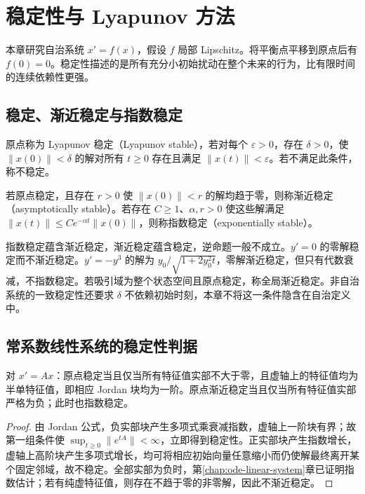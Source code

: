 \setcounter{chapter}{8} %
\chapter{稳定性与 Lyapunov 方法}
\label{chap:ode-stability}

本章研究自治系统 $x'=f(x)$，假设 $f$ 局部 Lipschitz。将平衡点平移到原点后有 $f(0)=0$。稳定性描述的是所有充分小初始扰动在整个未来的行为，比有限时间的连续依赖性更强。

\section{稳定、渐近稳定与指数稳定}
\begin{definition}
原点称为 Lyapunov 稳定（Lyapunov stable），若对每个 $\varepsilon>0$，存在 $\delta>0$，使 $\|x(0)\|<\delta$ 的解对所有 $t\geq0$ 存在且满足 $\|x(t)\|<\varepsilon$。若不满足此条件，称不稳定。

若原点稳定，且存在 $r>0$ 使 $\|x(0)\|<r$ 的解均趋于零，则称渐近稳定（asymptotically stable）。若存在 $C\geq1$、$\alpha,r>0$ 使这些解满足 $\|x(t)\|\leq Ce^{-\alpha t}\|x(0)\|$，则称指数稳定（exponentially stable）。
\end{definition}

指数稳定蕴含渐近稳定，渐近稳定蕴含稳定，逆命题一般不成立。$y'=0$ 的零解稳定而不渐近稳定。$y'=-y^3$ 的解为 $y_0/\sqrt{1+2y_0^2t}$，零解渐近稳定，但只有代数衰减，不指数稳定。若吸引域为整个状态空间且原点稳定，称全局渐近稳定。非自治系统的一致稳定性还要求 $\delta$ 不依赖初始时刻，本章不将这一条件隐含在自治定义中。

\section{常系数线性系统的稳定性判据}
\begin{theorem}
\label{thm:ode-linear-stability}
对 $x'=Ax$：原点稳定当且仅当所有特征值实部不大于零，且虚轴上的特征值均为半单特征值，即相应 Jordan 块均为一阶。原点渐近稳定当且仅当所有特征值实部严格为负；此时也指数稳定。
\end{theorem}
\begin{proof}
由 Jordan 公式，负实部块产生多项式乘衰减指数，虚轴上一阶块有界；故第一组条件使 $\sup_{t\geq0}\|e^{tA}\|<\infty$，立即得到稳定性。正实部块产生指数增长，虚轴上高阶块产生多项式增长，均可将相应初始向量任意缩小而仍使解最终离开某个固定邻域，故不稳定。全部实部为负时，第\ref{chap:ode-linear-system}章已证明指数估计；若有纯虚特征值，则存在不趋于零的非零解，因此不渐近稳定。
\end{proof}

